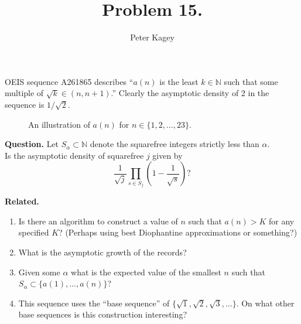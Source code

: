 \documentclass{article}
\newenvironment{question}{\begin{trivlist}\item[\textbf{Question.}]}{\end{trivlist}}
\newenvironment{related}{\begin{trivlist}\item[\textbf{Related.}]\end{trivlist}\begin{enumerate}}{\end{enumerate}}
\begin{document}
\title{Problem 15.}
\date{}
\author{Peter Kagey}
\maketitle
  OEIS sequence A261865 describes ``$a(n)$ is the least $k \in \mathbb{N}$ such
  that some multiple of $\sqrt{k} \in (n, n+1)$.'' Clearly the asymptotic
  density of $2$ in the sequence is $1/\sqrt{2}$.
\begin{figure}[!h]
  \centering
  \caption{
    An illustration of $a(n)$ for $n \in \{1,2,\hdots,23\}$.
  }
\end{figure}

\begin{question}
  Let $S_\alpha \subset \mathbb{N}$ denote the squarefree integers strictly
  less than $\alpha$.\\
  Is the asymptotic density of squarefree $j$ given by \[
    \frac{1}{\sqrt{j}}\prod_{s \in S_j}\left(1 - \frac{1}{\sqrt{s}}\right)?
  \]
\end{question}

\begin{related}
  \item Is there an algorithm to construct a value of $n$ such that $a(n) > K$
    for any specified $K$?
    (Perhaps using best Diophantine approximations or something?)
  \item What is the asymptotic growth of the records?
  \item Given some $\alpha$ what is the expected value of the smallest $n$ such
    that $S_\alpha \subset \{a(1), \hdots, a(n)\}$?
  \item This sequence uses the ``base sequence'' of
    $\{\sqrt{1},\sqrt{2},\sqrt{3},\hdots\}$. On what other base sequences is
    this construction interesting?
\end{related}
\end{document}
